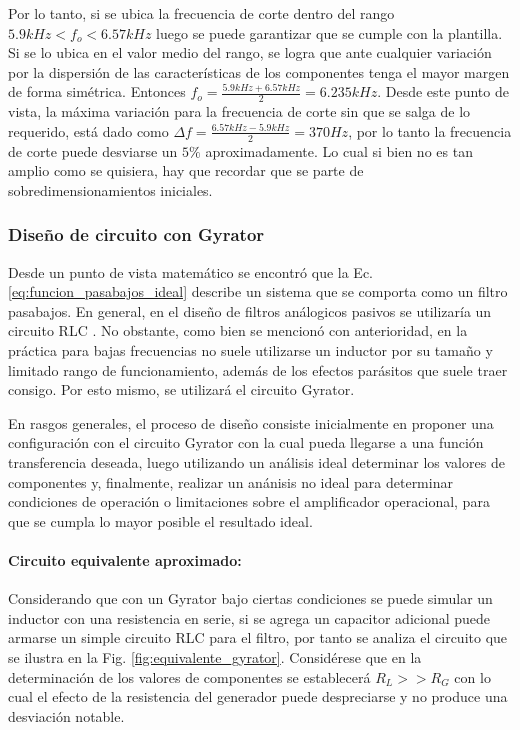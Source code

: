 Por lo tanto, si se ubica la frecuencia de corte dentro del rango $5.9kHz < f_o < 6.57kHz$ luego se puede garantizar que se cumple con la plantilla. Si se lo ubica en el valor medio del rango,
se logra que ante cualquier variaci\'on por la dispersi\'on de las caracter\'isticas de los componentes tenga el mayor margen de forma sim\'etrica. 
Entonces $f_o = \frac{5.9kHz + 6.57kHz}{2} = 6.235kHz$. Desde este punto de vista, la m\'axima variaci\'on para la frecuencia de corte sin que se salga de lo requerido,
est\'a dado como $\Delta f = \frac{6.57kHz - 5.9kHz}{2} = 370Hz$, por lo tanto la frecuencia de corte puede desviarse un $5\%$ aproximadamente. Lo cual si bien no es tan amplio como se quisiera, hay que recordar
que se parte de sobredimensionamientos iniciales.

\subsubsection{Dise\~no de circuito con Gyrator}
Desde un punto de vista matem\'atico se encontr\'o que la Ec. \ref{eq:funcion_pasabajos_ideal} describe un sistema que se comporta como un filtro pasabajos. En general, en el dise\~no de filtros an\'alogicos pasivos se utilizar\'ia un circuito RLC . No obstante, como bien se mencion\'o con anterioridad, en la pr\'actica para bajas frecuencias no suele utilizarse un inductor por su tama\~no y limitado rango de funcionamiento,
adem\'as de los efectos par\'asitos que suele traer consigo. Por esto mismo, se utilizar\'a el circuito Gyrator.

En rasgos generales, el proceso de dise\~no consiste inicialmente en proponer una configuraci\'on con el circuito Gyrator con la cual pueda llegarse a una funci\'on transferencia deseada,
luego utilizando un an\'alisis ideal determinar los valores de componentes y, finalmente, realizar un an\'anisis no ideal para determinar condiciones de operaci\'on o limitaciones sobre
el amplificador operacional, para que se cumpla lo mayor posible el resultado ideal.

\paragraph*{Circuito equivalente aproximado:} Considerando que con un Gyrator bajo ciertas condiciones se puede simular un inductor con una resistencia en serie, si se agrega un capacitor adicional puede armarse un simple circuito RLC para el filtro,
por tanto se analiza el circuito que se ilustra en la Fig. \ref{fig:equivalente_gyrator}. Consid\'erese que en la determinaci\'on de los valores de componentes se establecer\'a $R_L >> R_G$ con lo cual el efecto de 
la resistencia del generador puede despreciarse y no produce una desviaci\'on notable. 

